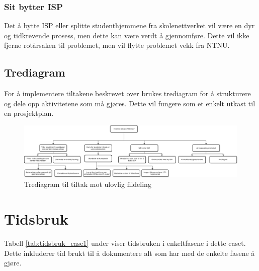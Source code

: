 \subsubsection{Sit bytter ISP}
Det å bytte ISP eller splitte studenthjemmene fra skolenettverket vil være en dyr og tidkrevende prosess, men dette kan være verdt å gjennomføre. Dette vil ikke fjerne rotårsaken til problemet, men vil flytte problemet vekk fra NTNU.

\subsection{Trediagram}
For å implementere tiltakene beskrevet over brukes trediagram for å strukturere og dele opp aktivitetene som må gjøres. Dette vil fungere som et enkelt utkast til en prosjektplan. 

\begin{figure}[H] 
    \centering    
    \includegraphics[scale=0.55, angle=90]{case_1/bilder/Tre-diagram.pdf}
    \caption[Trediagram til tiltak mot ulovlig fildeling]{Trediagram til tiltak mot ulovlig fildeling}
    \label{fig:case1-Tre-diagram}
\end{figure}

\section{Tidsbruk}
Tabell \ref{tab:tidsbruk_case1} under viser tidsbruken i enkeltfasene i dette caset. Dette inkluderer tid brukt til å dokumentere alt som har med de enkelte fasene å gjøre. 

